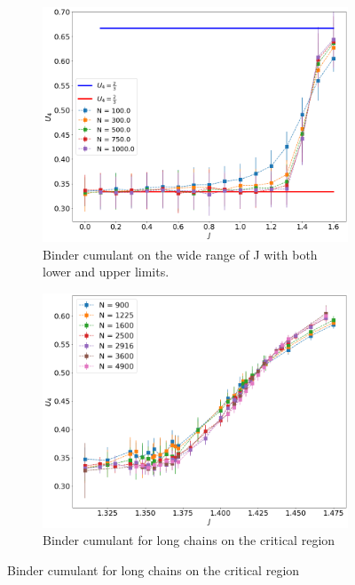  \begin{figure}[!ht]
	\centering
	\captionsetup{justification=centering}
	\begin{subfigure}[b]{0.45\textwidth}
		\includegraphics[width=\textwidth]{Images/bindercumulants_shortchains.png}
		\caption{ Binder cumulant on the wide range of J with both lower and upper limits.  }
		\label{fig:bcshort_shortbc}
	\end{subfigure}
	\begin{subfigure}[b]{0.45\textwidth}
		\includegraphics[width=\textwidth]{Images/bindercumulants_longchains.png}
		\caption{ Binder cumulant for long chains on the critical region}
		\label{fig:bcshort_longbc}
	\end{subfigure}

\end{figure}
